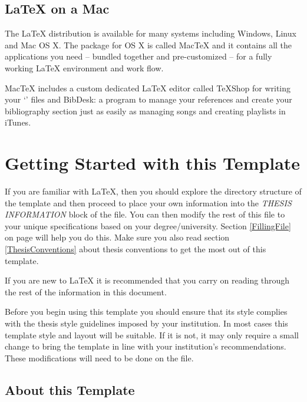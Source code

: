 \subsection{\LaTeX{} on a Mac}
 
The \LaTeX{} distribution is available for many systems including Windows, Linux and Mac OS X. The package for OS X is called MacTeX and it contains all the applications you need -- bundled together and pre-customized -- for a fully working \LaTeX{} environment and work flow.
 
MacTeX includes a custom dedicated \LaTeX{} editor called TeXShop for writing your `' files and BibDesk: a program to manage your references and create your bibliography section just as easily as managing songs and creating playlists in iTunes.


\section{Getting Started with this Template}

If you are familiar with \LaTeX{}, then you should explore the directory structure of the template and then proceed to place your own information into the \emph{THESIS INFORMATION} block of the  file. You can then modify the rest of this file to your unique specifications based on your degree/university. Section \ref{FillingFile} on page \pageref{FillingFile} will help you do this. Make sure you also read section \ref{ThesisConventions} about thesis conventions to get the most out of this template.

If you are new to \LaTeX{} it is recommended that you carry on reading through the rest of the information in this document.

Before you begin using this template you should ensure that its style complies with the thesis style guidelines imposed by your institution. In most cases this template style and layout will be suitable. If it is not, it may only require a small change to bring the template in line with your institution's recommendations. These modifications will need to be done on the  file.

\subsection{About this Template}


